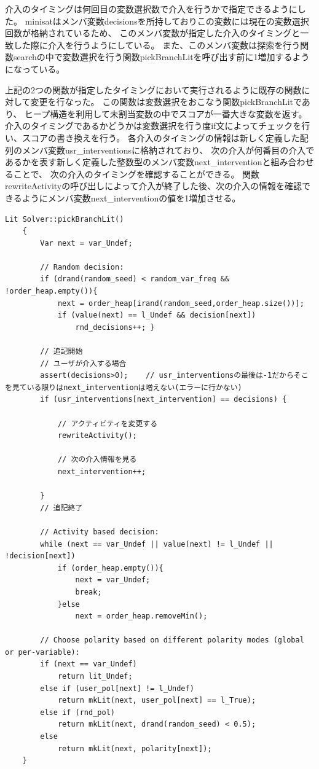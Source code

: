 介入のタイミングは何回目の変数選択数で介入を行うかで指定できるようにした。
minisatはメンバ変数decisionsを所持しておりこの変数には現在の変数選択回数が格納されているため、
このメンバ変数が指定した介入のタイミングと一致した際に介入を行うようにしている。
また、このメンバ変数は探索を行う関数searchの中で変数選択を行う関数pickBranchLitを呼び出す前に1増加するようになっている。

上記の2つの関数が指定したタイミングにおいて実行されるように既存の関数に対して変更を行なった。
この関数は変数選択をおこなう関数pickBranchLitであり、
ヒープ構造を利用して未割当変数の中でスコアが一番大きな変数を返す。
介入のタイミングであるかどうかは変数選択を行う度if文によってチェックを行い、スコアの書き換えを行う。
各介入のタイミングの情報は新しく定義した配列のメンバ変数usr\_interventionsに格納されており、
次の介入が何番目の介入であるかを表す新しく定義した整数型のメンバ変数next\_interventionと組み合わせることで、
次の介入のタイミングを確認することができる。
関数rewriteActivityの呼び出しによって介入が終了した後、次の介入の情報を確認できるようにメンバ変数next\_interventionの値を1増加させる。
\begin{lstlisting}[caption=関数pickBranchLitの変更による介入の追加(core/Solver.cc), firstnumber=249]
	Lit Solver::pickBranchLit()
	{
    	Var next = var_Undef;

    	// Random decision:
    	if (drand(random_seed) < random_var_freq && !order_heap.empty()){
        	next = order_heap[irand(random_seed,order_heap.size())];
        	if (value(next) == l_Undef && decision[next])
            	rnd_decisions++; }
		
		// 追記開始
		// ユーザが介入する場合
		assert(decisions>0);    // usr_interventionsの最後は-1だからそこを見ている限りはnext_interventionは増えない(エラーに行かない)
		if (usr_interventions[next_intervention] == decisions) {
			
			// アクティビティを変更する
			rewriteActivity();
			
			// 次の介入情報を見る
			next_intervention++;
			
		}
		// 追記終了

    	// Activity based decision:
    	while (next == var_Undef || value(next) != l_Undef || !decision[next])
        	if (order_heap.empty()){
        	    next = var_Undef;
        	    break;
        	}else
            	next = order_heap.removeMin();

    	// Choose polarity based on different polarity modes (global or per-variable):
    	if (next == var_Undef)
    	    return lit_Undef;
    	else if (user_pol[next] != l_Undef)
    	    return mkLit(next, user_pol[next] == l_True);
    	else if (rnd_pol)
    	    return mkLit(next, drand(random_seed) < 0.5);
    	else
    	    return mkLit(next, polarity[next]);
	}
\end{lstlisting}



